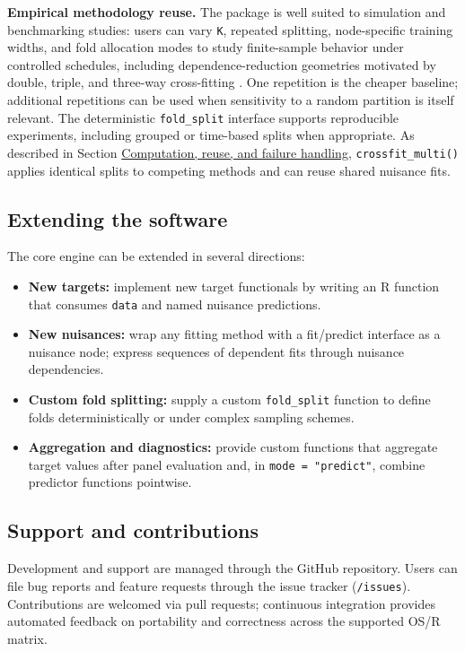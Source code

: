 \textbf{Empirical methodology reuse.} The package is well suited to simulation and benchmarking studies: users can vary \texttt{K}, repeated splitting, node-specific training widths, and fold allocation modes to study finite-sample behavior under controlled schedules, including dependence-reduction geometries motivated by double, triple, and three-way cross-fitting \citep{mcclean2024, fisher2023, ke2024, chiang2022}. One repetition is the cheaper baseline; additional repetitions can be used when sensitivity to a random partition is itself relevant. The deterministic \texttt{fold\_split} interface supports reproducible experiments, including grouped or time-based splits when appropriate. As described in Section \hyperref[subsec:performance]{Computation, reuse, and failure handling}, \texttt{crossfit\_multi()} applies identical splits to competing methods and can reuse shared nuisance fits.

\subsection{Extending the software}\label{extending-the-software}

The core engine can be extended in several directions:

\begin{itemize}
\tightlist
\item
  \textbf{New targets:} implement new target functionals by writing an R function that consumes \texttt{data} and named nuisance predictions.
\item
  \textbf{New nuisances:} wrap any fitting method with a fit/predict interface as a nuisance node; express sequences of dependent fits through nuisance dependencies.
\item
  \textbf{Custom fold splitting:} supply a custom \texttt{fold\_split} function to define folds deterministically or under complex sampling schemes.
\item
  \textbf{Aggregation and diagnostics:} provide custom functions that aggregate target values after panel evaluation and, in \texttt{mode\ =\ "predict"}, combine predictor functions pointwise.
\end{itemize}

\subsection{Support and contributions}\label{support-and-contributions}

Development and support are managed through the GitHub repository. Users can file bug reports and feature requests through the issue tracker (\texttt{/issues}). Contributions are welcomed via pull requests; continuous integration provides automated feedback on portability and correctness across the supported OS/R matrix.

